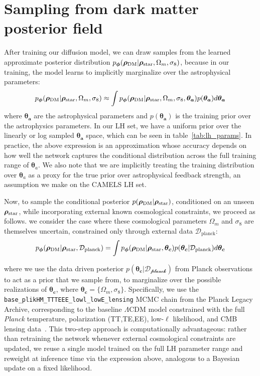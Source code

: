 \section{Sampling from dark matter posterior field}
\label{sec:field_pos_samp}
After training our diffusion model, we can draw samples from the learned approximate posterior distribution $p_{\boldsymbol{\phi}}(\boldsymbol{\rho}_\mathrm{DM}|\bm{\rho}_\text{star},\Omega_m,\sigma_8)$, because in our training, the model learns to implicitly marginalize over the astrophysical parameters:
 \begin{equation}
     p_{\boldsymbol{\phi}} (\boldsymbol{\rho}_\mathrm{DM}|\bm{\rho}_\text{star},\Omega_m,\sigma_8)\approx\int p_{\boldsymbol{\phi}}(\boldsymbol{\rho}_\mathrm{DM}|\bm{\rho}_\text{star},\Omega_m,\sigma_8,\bm{\theta_a})p(\bm{\theta_a})d\bm{\theta_a}
     \label{eq:astro_marginal}
 \end{equation}
where $\bm{\theta_a}$ are the astrophysical parameters and $p(\bm{\theta_a})$ is the training prior over the astrophysics parameters. In our LH set, we have a uniform prior over the linearly or log sampled $\bm{\theta_a}$ space, which can be seen in table~\ref{tab:lh_params}. In practice, the above expression is an approximation whose accuracy depends on how well the network captures the conditional distribution across the full training range of $\bm{\theta}_a$. We also note that we are implicitly treating the training distribution over $\bm{\theta}_a$ as a proxy for the true prior over astrophysical feedback strength, an assumption we make on the CAMELS LH set.

Now, to sample the conditional posterior $p(\boldsymbol{\rho}_\mathrm{DM}|\bm{\rho}_\text{star})$, conditioned on an unseen $\bm{\rho}_\text{star}$, while incorporating external known cosmological constraints, we proceed as follows. we consider the case where these cosmological parameters $\Omega_m$ and $\sigma_8$ are themselves uncertain, constrained only through external data $\mathcal{D}_{\text{planck}}$:
 \begin{equation}
     p_{\boldsymbol{\phi}} (\boldsymbol{\rho}_\mathrm{DM}|\bm{\rho}_\text{star},\mathcal{D_\text{planck}}) = \int p_{\boldsymbol{\phi}} (\boldsymbol{\rho}_\mathrm{DM}|\bm{\rho}_\text{star},\bm{\theta_c})p(\bm{\theta_c}|\mathcal{D_\text{planck}})d\bm{\theta_c}
     \label{eq:planck_marginal}
 \end{equation}

where we use the data driven posterior $p(\bm{\theta_c}|\mathcal{D_\text{planck}})$ from Planck observations to act as a prior that we sample from, to marginalize over the possible realizations of $\bm{\theta_c}$, where $\bm{\theta_c}=\{\Omega_m, \sigma_8\}$. Specifically, we use the \texttt{base\_plikHM\_TTTEEE\_lowl\_lowE\_lensing}
MCMC chain from the Planck Legacy Archive, corresponding to the baseline
$\Lambda$CDM model constrained with the full \textit{Planck} temperature,
polarization (TT,TE,EE), low-$\ell$ likelihood, and CMB lensing
data~\citep{planck_collaboration_planck_2020}. This two-step approach is computationally advantageous: rather than retraining the network whenever external cosmological constraints are updated, we reuse a single model trained on the full LH parameter range and reweight at inference time via the expression above, analogous to a Bayesian update on a fixed likelihood.

